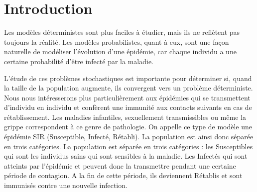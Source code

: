\chapter{Introduction}

Les modèles déterministes sont plus faciles à étudier, mais ils ne reflètent pas toujours la réalité. Les modèles probabilistes, quant à eux, sont une façon naturelle de modéliser l’évolution d’une épidémie, car chaque individu a une certaine probabilité d’être infecté par la maladie.

L’étude de ces problèmes stochastiques est importante pour déterminer si, quand la taille de la population augmente, ils convergent vers un problème déterministe. Nous nous intéresserons plus particulièrement aux épidémies qui se transmettent d’individu en individu et confèrent une immunité aux contacts suivants en cas de rétablissement. Les maladies infantiles, sexuellement transmissibles ou même la grippe correspondent à ce genre de pathologie. On appelle ce type de modèle une épidémie SIR (Susceptible, Infecté, Rétabli). La population est ainsi donc séparée en trois catégories. La population est séparée en trois catégories : les Susceptibles qui sont les individus sains qui sont sensibles à la maladie. Les Infectés qui sont atteints par l’épidémie et peuvent donc la transmettre pendant une certaine période de contagion. A la fin de
cette période, ils deviennent Rétablis et sont immunisés contre une nouvelle infection.
